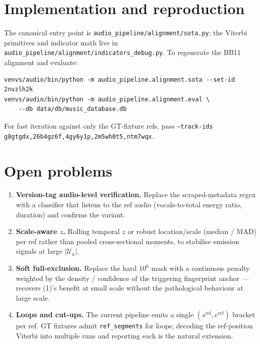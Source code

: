 \documentclass[11pt,a4paper]{article}
\begin{document}
\section{Implementation and reproduction}

The canonical entry point is \texttt{audio\_pipeline/alignment/sota.py}; the Viterbi primitives and indicator math live in \texttt{audio\_pipeline/alignment/indicators\_debug.py}. To regenerate the BB11 alignment and evaluate:
\begin{verbatim}
venvs/audio/bin/python -m audio_pipeline.alignment.sota --set-id 2nvzlh2k
venvs/audio/bin/python -m audio_pipeline.alignment.eval \
    --db data/db/music_database.db
\end{verbatim}
For fast iteration against only the GT-fixture refs, pass \texttt{--track-ids g8gtgdx,26b4gz6f,4gy6y1p,2m5wh0t5,ntm7wqx}.

\section{Open problems}

\begin{enumerate}[leftmargin=1.5em, itemsep=0.1em]
\item \textbf{Version-tag audio-level verification.} Replace the scraped-metadata regex with a classifier that listens to the ref audio (vocals-to-total energy ratio, duration) and confirms the variant.
\item \textbf{Scale-aware $z$.} Rolling temporal $z$ or robust location/scale (median / MAD) per ref rather than pooled cross-sectional moments, to stabilise emission signals at large $|\mathcal{U}_u|$.
\item \textbf{Soft full-exclusion.} Replace the hard $10^6$ mask with a continuous penalty weighted by the density / confidence of the triggering fingerprint anchor --- recovers (1)'s benefit at small scale without the pathological behaviour at large scale.
\item \textbf{Loops and cut-ups.} The current pipeline emits a single $(s^{\text{ref}}, e^{\text{ref}})$ bracket per ref. GT fixtures admit \texttt{ref\_segments} for loops; decoding the ref-position Viterbi into multiple runs and reporting each is the natural extension.
\end{enumerate}
\end{document}
